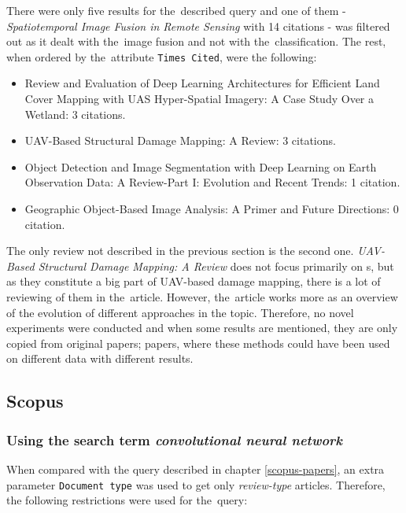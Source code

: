 \noindent There were only five results for the~described query and one of them - \textit{Spatiotemporal Image Fusion in Remote Sensing} \cite{review-st-fusion} with 14 citations - was filtered out as it dealt with the~image fusion and not with the~classification. The rest, when ordered by the~attribute \verb|Times Cited|, were the following:

\begin{itemize}
	\item Review and Evaluation of Deep Learning Architectures for Efficient Land Cover Mapping with UAS Hyper-Spatial Imagery: A Case Study Over a Wetland: 3 citations. \cite{review-dl-wetlands}
	\item UAV-Based Structural Damage Mapping: A Review: 3 citations. \cite{uav-building-damages}
	\item Object Detection and Image Segmentation with Deep Learning on Earth Observation Data: A Review-Part I: Evolution and Recent Trends: 1 citation. \cite{review-dl-eo}
	\item Geographic Object-Based Image Analysis: A Primer and Future Directions: 0 citation. \cite{geobia}
\end{itemize}

The only review not described in the previous section is the second one. \textit{UAV-Based Structural Damage Mapping: A Review} does not focus primarily on s, but as they constitute a big part of UAV-based damage mapping, there is a lot of reviewing of them in the~article. However, the~article works more as an overview of the evolution of different approaches in the topic. Therefore, no novel experiments were conducted and when some results are mentioned, they are only copied from original papers; papers, where these methods could have been used on different data with different results.

\subsection{Scopus}
\label{scopus-reviews}

\subsubsection{Using the search term \textit{convolutional neural network}}
\label{scopus-reviews-full-length}

When compared with the query described in chapter \ref{scopus-papers}, an extra parameter \verb|Document type| was used to get only \textit{review-type} articles. Therefore, the following restrictions were used for the~query:

